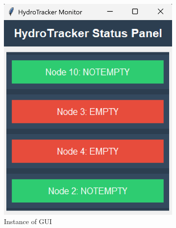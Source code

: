 \begin{figure}[H]
    \centering
    \begin{subfigure}[b]{0.4\linewidth}
        \centering
        \includegraphics[width=\linewidth]{gui_images/gui_screenshot_1.png}
        \caption{Instance of GUI}
        \label{fig:subfig1}
    \end{subfigure}
    \hfill
    \begin{subfigure}[b]{0.4\linewidth}
        \centering

\end{subfigure}
\end{figure}
